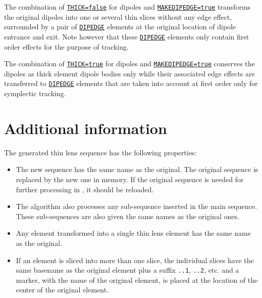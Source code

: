 The combination of \hyperref[sec:numberofslices]{\texttt{THICK=false}}
for dipoles and \hyperref[sec:makethin]{\texttt{MAKEDIPEDGE=true}} 
transforms the original dipoles into one or several thin slices without 
any edge effect, surrounded by a pair of
\hyperref[sec:dipedge]{\texttt{DIPEDGE}}  
elements at the original location of dipole entrance and exit. 
Note however that these \hyperref[sec:dipedge]{\texttt{DIPEDGE}}
elements only contain first order effects for the purpose of tracking. 

The combination of \hyperref[sec:numberofslices]{\texttt{THICK=true}}
for dipoles and \hyperref[sec:makethin]{\texttt{MAKEDIPEDGE=true}} 
conserves the dipoles as thick element dipole bodies only while their
associated edge effects are transferred to
\hyperref[sec:dipedge]{\texttt{DIPEDGE}} elements that are taken into
account at first order only for symplectic tracking. 

\section{Additional information}

The generated thin lens sequence has the following properties: 
\begin{itemize}
\item The new sequence has the same name as the original. 
  The original sequence is replaced by the new one in memory. 
  If the original sequence is needed for further processing in \madx, 
  it should be reloaded.
\item The algorithm also processes any sub-sequence inserted in the main
  sequence. These sub-sequences are also given the same names as the
  original ones. 
\item Any element transformed into a single thin lens element has the
  same name as the original. 
\item If an element is sliced into more than one slice, the individual
  slices have the same basename as the original element plus a suffix 
  \texttt{..1}, \texttt{..2}, etc. and a marker, with the name of the
  original element, is placed at the location of the center of the
  original element. 
\end{itemize}


